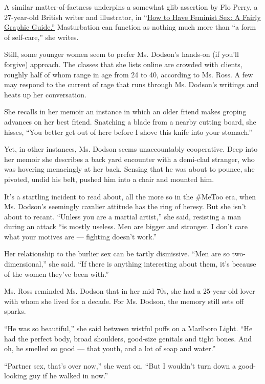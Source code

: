 A similar matter-of-factness underpins a somewhat glib assertion by Flo
Perry, a 27-year-old British writer and illustrator, in
``\href{https://www.penguin.co.uk/books/313/313049/how-to-have-feminist-sex/9780241391563.html}{How
to Have Feminist Sex: A Fairly Graphic Guide.''} Masturbation can
function as nothing much more than ``a form of self-care,'' she writes.

Still, some younger women seem to prefer Ms. Dodson's hands-on (if
you'll forgive) approach. The classes that she lists online are crowded
with clients, roughly half of whom range in age from 24 to 40, according
to Ms. Ross. A few may respond to the current of rage that runs through
Ms. Dodson's writings and heats up her conversation.

She recalls in her memoir an instance in which an older friend makes
groping advances on her best friend. Snatching a blade from a nearby
cutting board, she hisses, ``You better get out of here before I shove
this knife into your stomach.''

Yet, in other instances, Ms. Dodson seems unaccountably cooperative.
Deep into her memoir she describes a back yard encounter with a
demi-clad stranger, who was hovering menacingly at her back. Sensing
that he was about to pounce, she pivoted, undid his belt, pushed him
into a chair and mounted him.

It's a startling incident to read about, all the more so in the \#MeToo
era, when Ms. Dodson's seemingly cavalier attitude has the ring of
heresy. But she isn't about to recant. ``Unless you are a martial
artist,'' she said, resisting a man during an attack ``is mostly
useless. Men are bigger and stronger. I don't care what your motives are
--- fighting doesn't work.''

Her relationship to the burlier sex can be tartly dismissive. ``Men are
so two-dimensional,'' she said. ``If there is anything interesting about
them, it's because of the women they've been with.''

Ms. Ross reminded Ms. Dodson that in her mid-70s, she had a 25-year-old
lover with whom she lived for a decade. For Ms. Dodson, the memory still
sets off sparks.

``He was so beautiful,'' she said between wistful puffs on a Marlboro
Light. ``He had the perfect body, broad shoulders, good-size genitals
and tight bones. And oh, he smelled so good --- that youth, and a lot of
soap and water.''

``Partner sex, that's over now,'' she went on. ``But I wouldn't turn
down a good-looking guy if he walked in now.''

